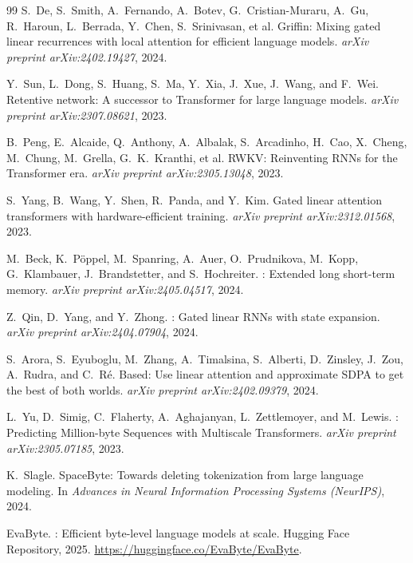 \documentclass{article}
\begin{document}
\begin{thebibliography}{99}
S.\ De, S.\ Smith, A.\ Fernando, A.\ Botev, G.\ Cristian-Muraru, A.\ Gu,
R.\ Haroun, L.\ Berrada, Y.\ Chen, S.\ Srinivasan, et al.
\newblock Griffin: Mixing gated linear recurrences with local attention for
efficient language models.
\newblock \emph{arXiv preprint arXiv:2402.19427}, 2024.

Y.\ Sun, L.\ Dong, S.\ Huang, S.\ Ma, Y.\ Xia, J.\ Xue, J.\ Wang, and
F.\ Wei.
\newblock Retentive network: A successor to Transformer for large language
models.
\newblock \emph{arXiv preprint arXiv:2307.08621}, 2023.

B.\ Peng, E.\ Alcaide, Q.\ Anthony, A.\ Albalak, S.\ Arcadinho, H.\ Cao,
X.\ Cheng, M.\ Chung, M.\ Grella, G.\ K.\ Kranthi, et al.
\newblock RWKV: Reinventing RNNs for the Transformer era.
\newblock \emph{arXiv preprint arXiv:2305.13048}, 2023.

S.\ Yang, B.\ Wang, Y.\ Shen, R.\ Panda, and Y.\ Kim.
\newblock Gated linear attention transformers with hardware-efficient training.
\newblock \emph{arXiv preprint arXiv:2312.01568}, 2023.

M.\ Beck, K.\ P\"{o}ppel, M.\ Spanring, A.\ Auer, O.\ Prudnikova,
M.\ Kopp, G.\ Klambauer, J.\ Brandstetter, and S.\ Hochreiter.
: Extended long short-term memory.
\newblock \emph{arXiv preprint arXiv:2405.04517}, 2024.

Z.\ Qin, D.\ Yang, and Y.\ Zhong.
: Gated linear RNNs with state expansion.
\newblock \emph{arXiv preprint arXiv:2404.07904}, 2024.

S.\ Arora, S.\ Eyuboglu, M.\ Zhang, A.\ Timalsina, S.\ Alberti,
D.\ Zinsley, J.\ Zou, A.\ Rudra, and C.\ R\'{e}.
\newblock Based: Use linear attention and approximate {SDPA} to get the best of
both worlds.
\newblock \emph{arXiv preprint arXiv:2402.09379}, 2024.

L.\ Yu, D.\ Simig, C.\ Flaherty, A.\ Aghajanyan, L.\ Zettlemoyer, and M.\ Lewis.
: Predicting Million-byte Sequences with Multiscale Transformers.
\newblock \emph{arXiv preprint arXiv:2305.07185}, 2023.

K.\ Slagle.
\newblock SpaceByte: Towards deleting tokenization from large language
modeling.
\newblock In \emph{Advances in Neural Information Processing Systems (NeurIPS)},
2024.

EvaByte.
: Efficient byte-level language models at scale.
\newblock Hugging Face Repository, 2025.
\newblock \url{https://huggingface.co/EvaByte/EvaByte}.


\end{thebibliography}
\end{document}
